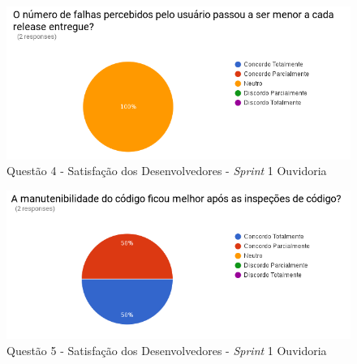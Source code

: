 \begin{figure}[!h]
\includegraphics[width=\textwidth]{figuras/s4o.png}
\caption{Questão 4 - Satisfação dos Desenvolvedores - \textit{Sprint} 1 Ouvidoria}
\end{figure}

\begin{figure}[!h]
\includegraphics[width=\textwidth]{figuras/s5o.png}
\caption{Questão 5 - Satisfação dos Desenvolvedores - \textit{Sprint} 1 Ouvidoria}
\end{figure}